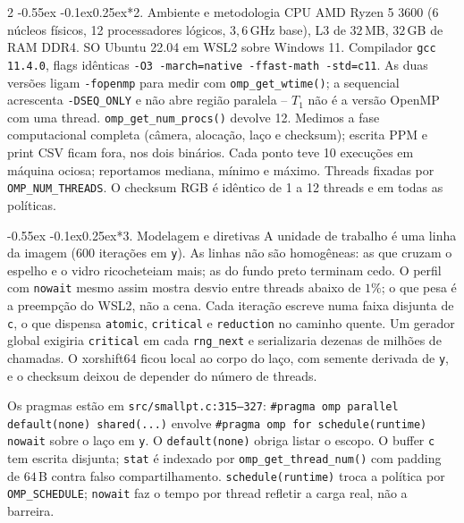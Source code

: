 \documentclass[10pt,a4paper]{article}
\makeatletter
\renewcommand\section{\@startsection{section}{1}{\z@}%
  {-0.55ex \@plus -0.1ex}{0.25ex}{\normalfont\normalsize\bfseries}}
\makeatother
\begin{document}
\begin{multicols}{2}
\section*{2. Ambiente e metodologia}
CPU AMD Ryzen 5 3600 (6 n\'ucleos f\'isicos, 12 processadores l\'ogicos,
$3{,}6$\,GHz base), L3 de $32$\,MB, $32$\,GB de RAM DDR4. SO Ubuntu 22.04 em
WSL2 sobre Windows 11. Compilador \texttt{gcc 11.4.0}, flags id\^enticas
\texttt{-O3 -march=native -ffast-math -std=c11}. As duas vers\~oes ligam
\texttt{-fopenmp} para medir com \texttt{omp\_get\_wtime()}; a sequencial
acrescenta \texttt{-DSEQ\_ONLY} e n\~ao abre regi\~ao paralela -- $T_1$ n\~ao \'e
a vers\~ao OpenMP com uma thread. \texttt{omp\_get\_num\_procs()} devolve 12.
Medimos a fase computacional completa (c\^amera, aloca\c{c}\~ao, la\c{c}o e
checksum); escrita PPM e print CSV ficam fora, nos dois bin\'arios. Cada ponto
teve 10 execu\c{c}\~oes em m\'aquina ociosa; reportamos mediana, m\'inimo e
m\'aximo. Threads fixadas por \texttt{OMP\_NUM\_THREADS}. O checksum RGB \'e
id\^entico de 1 a 12 threads e em todas as pol\'iticas.

\section*{3. Modelagem e diretivas}
A unidade de trabalho \'e uma linha da imagem ($600$ itera\c{c}\~oes em
\texttt{y}). As linhas n\~ao s\~ao homog\^eneas: as que cruzam o espelho e o
vidro ricocheteiam mais; as do fundo preto terminam cedo. O perfil com
\texttt{nowait} mesmo assim mostra desvio entre threads abaixo de $1\%$; o que
pesa \'e a preemp\c{c}\~ao do WSL2, n\~ao a cena. Cada itera\c{c}\~ao escreve
numa faixa disjunta de \texttt{c}, o que dispensa \texttt{atomic},
\texttt{critical} e \texttt{reduction} no caminho quente. Um gerador global
exigiria \texttt{critical} em cada \texttt{rng\_next} e serializaria dezenas de
milh\~oes de chamadas. O xorshift64 ficou local ao corpo do la\c{c}o, com
semente derivada de \texttt{y}, e o checksum deixou de depender do n\'umero de
threads.

Os pragmas est\~ao em \texttt{src/smallpt.c:315--327}:
\texttt{\#pragma omp parallel default(none) shared(...)} envolve
\texttt{\#pragma omp for schedule(runtime) nowait} sobre o la\c{c}o em
\texttt{y}. O \texttt{default(none)} obriga listar o escopo. O buffer
\texttt{c} tem escrita disjunta; \texttt{stat} \'e indexado por
\texttt{omp\_get\_thread\_num()} com padding de $64$\,B contra falso
compartilhamento. \texttt{schedule(runtime)} troca a pol\'itica por
\texttt{OMP\_SCHEDULE}; \texttt{nowait} faz o tempo por thread refletir a
carga real, n\~ao a barreira.


\end{multicols}
\end{document}
